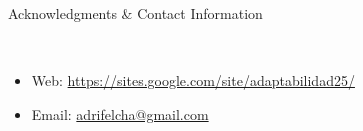 \documentclass[final]{beamer}
\newlength{\onecolwid}
\begin{document}
\begin{frame}[t]
\begin{columns}[t]
\begin{column}{\onecolwid}
\begin{alertblock}{Acknowledgments \& Contact Information}

\small{} \\

\begin{itemize}
\item Web: \href{https://sites.google.com/site/adaptabilidad25/}{https://sites.google.com/site/adaptabilidad25/}
\item Email: \href{mailto:adrifelcha@gmail.com}{adrifelcha@gmail.com}
\end{itemize}


\end{alertblock}
\end{column} %
\end{columns} %
\end{frame} %
\end{document}
